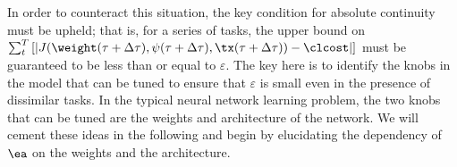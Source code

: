 In order to counteract this situation, the key condition for absolute continuity must be upheld; that is, for a series of tasks, the upper bound on 
$ \sum_{t}^T \left[ \left\vert J(\weight(\tau+\Delta \tau),\psi(\tau+\Delta \tau),\tx(\tau+\Delta \tau)) - \clcost \right\vert \right]$ must be guaranteed to be less than or equal to $\varepsilon$. The key here is to identify the knobs in the model that can be tuned to ensure that $\varepsilon$ is small even in the presence of dissimilar tasks. In the typical neural network learning problem, the two knobs that can be tuned are the weights and architecture of the network. We will cement these ideas in the following and begin by elucidating the dependency of $\ea$ on the weights and the architecture.


